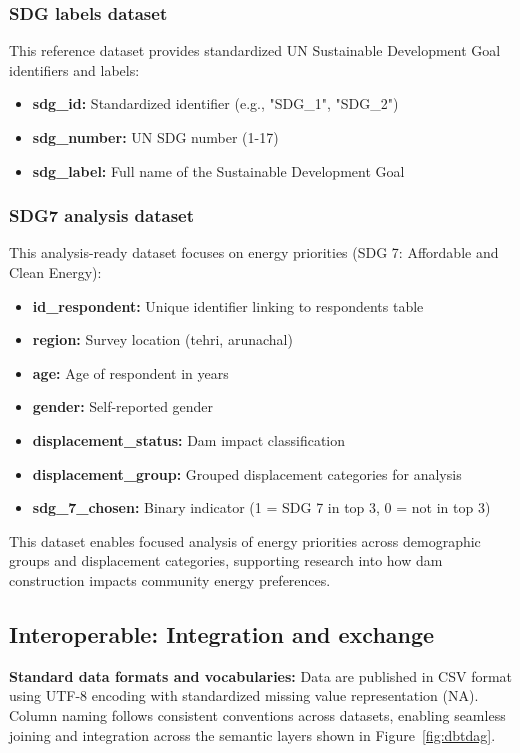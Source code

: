\documentclass{article}
\begin{document}
\subsubsection{SDG labels dataset}

This reference dataset provides standardized UN Sustainable Development Goal identifiers and labels:
\begin{itemize}
  \item \textbf{sdg\_id:} Standardized identifier (e.g., "SDG\_1", "SDG\_2")
  \item \textbf{sdg\_number:} UN SDG number (1-17)
  \item \textbf{sdg\_label:} Full name of the Sustainable Development Goal
\end{itemize}

\subsubsection{SDG7 analysis dataset}

This analysis-ready dataset focuses on energy priorities (SDG 7: Affordable and Clean Energy):
\begin{itemize}
  \item \textbf{id\_respondent:} Unique identifier linking to respondents table
  \item \textbf{region:} Survey location (tehri, arunachal)
  \item \textbf{age:} Age of respondent in years
  \item \textbf{gender:} Self-reported gender
  \item \textbf{displacement\_status:} Dam impact classification
  \item \textbf{displacement\_group:} Grouped displacement categories for analysis
  \item \textbf{sdg\_7\_chosen:} Binary indicator (1 = SDG 7 in top 3, 0 = not in top 3)
\end{itemize}

This dataset enables focused analysis of energy priorities across demographic groups and displacement categories, supporting research into how dam construction impacts community energy preferences.

\subsection{Interoperable: Integration and exchange}

\textbf{Standard data formats and vocabularies:} Data are published in CSV format \cite{csv_rfc} using UTF-8 encoding with standardized missing value representation (NA). Column naming follows consistent conventions across datasets, enabling seamless joining and integration across the semantic layers shown in Figure~\ref{fig:dbtdag}.
\end{document}

